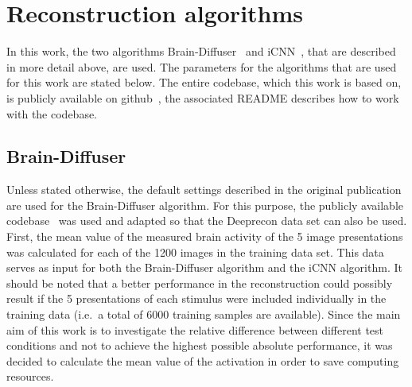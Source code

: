 


\section{Reconstruction algorithms}

In this work, the two algorithms Brain-Diffuser~\cite{ozcelikNaturalSceneReconstruction2023} and iCNN~\cite{shenDeepImageReconstruction2019}, that are described in more detail above, are used. The parameters for the algorithms that are used for this work are stated below. The entire codebase, which this work is based on, is publicly available on github~\cite{mildenbergerKamitaniLabBrain_diffuser}, the associated README describes how to work with the codebase. 

\subsection{Brain-Diffuser}
Unless stated otherwise, the default settings described in the original publication are used for the Brain-Diffuser algorithm. For this purpose, the publicly available codebase~\cite{ozcelikOzcelikfuBraindiffuser2025} was used and adapted so that the Deeprecon data set can also be used.
First, the mean value of the measured brain activity of the 5 image presentations was calculated for each of the 1200 images in the training data set. This data serves as input for both the Brain-Diffuser algorithm and the iCNN algorithm. It should be noted that a better performance in the reconstruction could possibly result if the 5 presentations of each stimulus were included individually in the training data (i.e.\ a total of 6000 training samples are available). Since the main aim of this work is to investigate the relative difference between different test conditions and not to achieve the highest possible absolute performance, it was decided to calculate the mean value of the activation in order to save computing resources.

